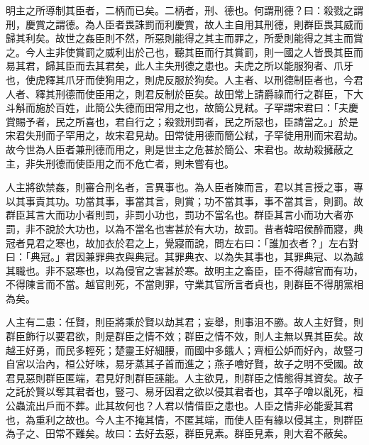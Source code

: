 
\begin{pinyinscope}
明主之所導制其臣者，二柄而已矣。二柄者，刑、德也。何謂刑德？曰：殺戮之謂刑，慶賞之謂德。為人臣者畏誅罰而利慶賞，故人主自用其刑德，則群臣畏其威而歸其利矣。故世之姦臣則不然，所惡則能得之其主而罪之，所愛則能得之其主而賞之。今人主非使賞罰之威利出於己也，聽其臣而行其賞罰，則一國之人皆畏其臣而易其君，歸其臣而去其君矣，此人主失刑德之患也。夫虎之所以能服狗者、爪牙也，使虎釋其爪牙而使狗用之，則虎反服於狗矣。人主者、以刑德制臣者也，今君人者、釋其刑德而使臣用之，則君反制於臣矣。故田常上請爵祿而行之群臣，下大斗斛而施於百姓，此簡公失德而田常用之也，故簡公見弒。子罕謂宋君曰：「夫慶賞賜予者，民之所喜也，君自行之；殺戮刑罰者，民之所惡也，臣請當之。」於是宋君失刑而子罕用之，故宋君見劫。田常徒用德而簡公弒，子罕徒用刑而宋君劫。故今世為人臣者兼刑德而用之，則是世主之危甚於簡公、宋君也。故劫殺擁蔽之主，非失刑德而使臣用之而不危亡者，則未嘗有也。

人主將欲禁姦，則審合刑名者，言異事也。為人臣者陳而言，君以其言授之事，專以其事責其功。功當其事，事當其言，則賞；功不當其事，事不當其言，則罰。故群臣其言大而功小者則罰，非罰小功也，罰功不當名也。群臣其言小而功大者亦罰，非不說於大功也，以為不當名也害甚於有大功，故罰。昔者韓昭侯醉而寢，典冠者見君之寒也，故加衣於君之上，覺寢而說，問左右曰：「誰加衣者？」左右對曰：「典冠。」君因兼罪典衣與典冠。其罪典衣、以為失其事也，其罪典冠、以為越其職也。非不惡寒也，以為侵官之害甚於寒。故明主之畜臣，臣不得越官而有功，不得陳言而不當。越官則死，不當則罪，守業其官所言者貞也，則群臣不得朋黨相為矣。

人主有二患：任賢，則臣將乘於賢以劫其君；妄舉，則事沮不勝。故人主好賢，則群臣飾行以要君欲，則是群臣之情不效；群臣之情不效，則人主無以異其臣矣。故越王好勇，而民多輕死；楚靈王好細腰，而國中多餓人；齊桓公妒而好內，故豎刁自宮以治內，桓公好味，易牙蒸其子首而進之；燕子噲好賢，故子之明不受國。故君見惡則群臣匿端，君見好則群臣誣能。人主欲見，則群臣之情態得其資矣。故子之託於賢以奪其君者也，豎刁、易牙因君之欲以侵其君者也，其卒子噲以亂死，桓公蟲流出戶而不葬。此其故何也？人君以情借臣之患也。人臣之情非必能愛其君也，為重利之故也。今人主不掩其情，不匿其端，而使人臣有緣以侵其主，則群臣為子之、田常不難矣。故曰：去好去惡，群臣見素。群臣見素，則大君不蔽矣。


\end{pinyinscope}